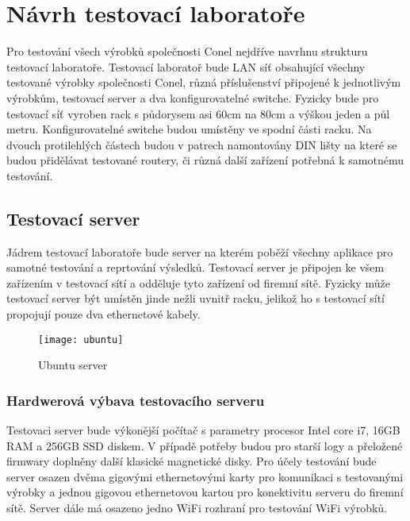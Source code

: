 \chapter{Návrh testovací laboratoře}

Pro testování všech výrobků společnosti Conel nejdříve navrhnu strukturu testovací laboratoře. Testovací laboratoř bude LAN síť obsahující všechny testované výrobky společnosti Conel, různá příslušenství připojené k jednotlivým výrobkům, testovací server a dva konfigurovatelné switche. Fyzicky bude pro testovací síť vyroben rack s půdorysem asi 60cm na 80cm a výškou jeden a půl metru. Konfigurovatelné switche budou umístěny ve spodní části racku. Na dvouch protilehlých částech budou v patrech namontovány DIN lišty na které se budou přidělávat testované routery, či různá další zařízení potřebná k samotnému testování.

\section{Testovací server}
Jádrem testovací laboratoře bude server na kterém poběží všechny aplikace pro samotné testování a reprtování výsledků. Testovací server je připojen ke všem zařízením v testovací sítí a odděluje tyto zařízení od firemní sítě. Fyzicky může testovací server být umístěn jinde nežli uvnitř racku, jelikož ho s testovací sítí propojují pouze dva ethernetové kabely.

\begin{figure}[h]
  \centering
  \texttt{[image: ubuntu]}
  \caption{Ubuntu server}
  \label{fig:ubuntu}
\end{figure}

\subsection{Hardwerová výbava testovacího serveru}
Testovaci server bude výkonější počítač s parametry procesor Intel core i7, 16GB RAM a 256GB SSD diskem. V případě potřeby budou pro starší logy a přeložené firmwary doplněny další klasické magnetické disky. Pro účely testování bude server osazen dvěma gigovými ethernetovými karty pro komunikaci s testovanými výrobky a jednou gigovou ethernetovou kartou pro konektivitu serveru do firemní sítě. Server dále má osazeno jedno WiFi rozhraní pro testování WiFi výrobků.

